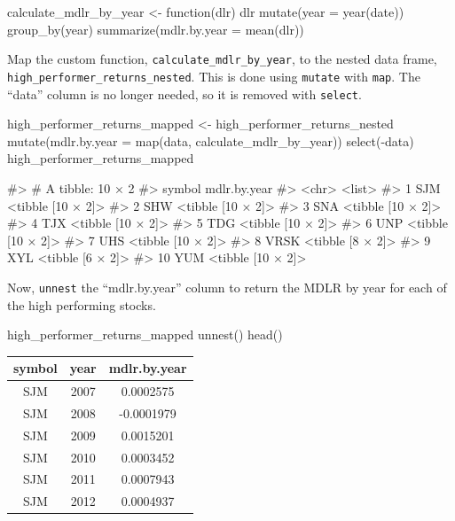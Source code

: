 \begin{Schunk}
\begin{Sinput}
calculate_mdlr_by_year <- function(dlr) {
    dlr %
        mutate(year = year(date)) %
        group_by(year) %
        summarize(mdlr.by.year = mean(dlr))
}
\end{Sinput}
\end{Schunk}

Map the custom function, \texttt{calculate\_mdlr\_by\_year}, to the
nested data frame, \texttt{high\_performer\_returns\_nested}. This is
done using \texttt{mutate} with \texttt{map}. The ``data'' column is no
longer needed, so it is removed with \texttt{select}.

\begin{Schunk}
\begin{Sinput}
high_performer_returns_mapped <- high_performer_returns_nested %
    mutate(mdlr.by.year = map(data, calculate_mdlr_by_year)) %
    select(-data)
high_performer_returns_mapped
\end{Sinput}
\begin{Soutput}
#> # A tibble: 10 × 2
#>    symbol      mdlr.by.year
#>     <chr>            <list>
#> 1     SJM <tibble [10 × 2]>
#> 2     SHW <tibble [10 × 2]>
#> 3     SNA <tibble [10 × 2]>
#> 4     TJX <tibble [10 × 2]>
#> 5     TDG <tibble [10 × 2]>
#> 6     UNP <tibble [10 × 2]>
#> 7     UHS <tibble [10 × 2]>
#> 8    VRSK  <tibble [8 × 2]>
#> 9     XYL  <tibble [6 × 2]>
#> 10    YUM <tibble [10 × 2]>
\end{Soutput}
\end{Schunk}

Now, \texttt{unnest} the ``mdlr.by.year'' column to return the MDLR by
year for each of the high performing stocks.

\begin{Schunk}
\begin{Sinput}
high_performer_returns_mapped %
    unnest() %
    head()
\end{Sinput}
\end{Schunk}

\begin{tabular}{ccc}
\toprule
symbol & year & mdlr.by.year\\
\midrule
SJM & 2007 & 0.0002575\\
SJM & 2008 & -0.0001979\\
SJM & 2009 & 0.0015201\\
SJM & 2010 & 0.0003452\\
SJM & 2011 & 0.0007943\\
SJM & 2012 & 0.0004937\\
\bottomrule
\end{tabular}

